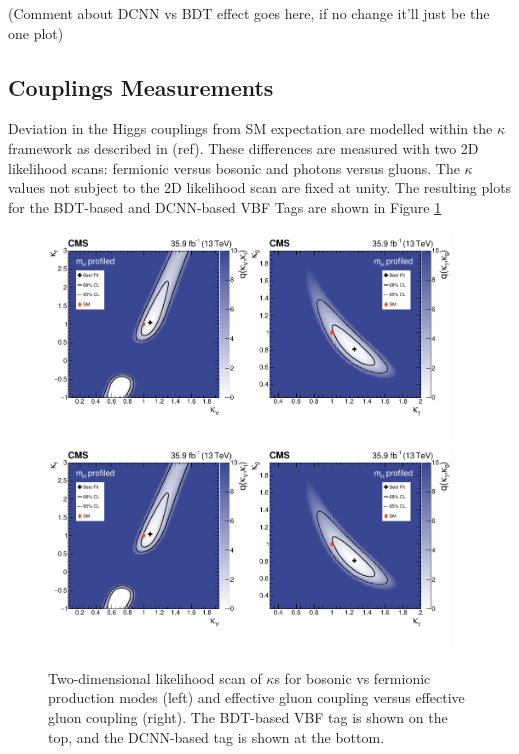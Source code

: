 (Comment about DCNN vs BDT effect goes here, if no change it'll just be the one plot)

\subsection{Couplings Measurements}
Deviation in the Higgs couplings from SM expectation are modelled within the $\kappa$ framework as described in (ref).
These differences are measured with two 2D likelihood scans: fermionic versus bosonic and photons versus gluons.
The $\kappa$ values not subject to the 2D likelihood scan are fixed at unity.
The resulting plots for the BDT-based and DCNN-based VBF Tags are shown in Figure \ref{fig:stats_results:kappa}
\begin{figure}[h!]
    \begin{center}
        \includegraphics[width=0.95\textwidth]{figures/stats_results/CMS-HIG-16-040_Figure_020.pdf}
        \includegraphics[width=0.95\textwidth]{figures/stats_results/CMS-HIG-16-040_Figure_020.pdf}
    \end{center}
    \caption{Two-dimensional likelihood scan of $\kappa$s for bosonic vs fermionic production modes (left) and effective gluon coupling versus effective gluon coupling (right).
             The BDT-based VBF tag is shown on the top, and the DCNN-based tag is shown at the bottom.}
        \label{fig:stats_results:kappa}
\end{figure}











